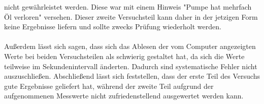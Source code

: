 nicht gewährleistet werden. Diese war mit einem Hinweis "Pumpe hat mehrfach Öl verloren"
versehen. Dieser zweite Versuchsteil kann daher in der jetzigen Form keine Ergebnisse
liefern und sollte zwecks Prüfung wiederholt werden.\\
\\
Außerdem lässt sich sagen, dass sich das Ablesen der vom Computer angezeigten Werte bei beiden Versuchsteilen
als schwierig gestaltet hat, da sich die Werte teilweise im Sekundenintervall änderten.
Dadurch sind systematische Fehler nicht auszuschließen. Abschließend lässt sich feststellen,
dass der erste Teil des Versuchs gute Ergebnisse geliefert hat, während der zweite Teil
aufgrund der aufgenommenen Messwerte nicht zufriedenstellend ausgewertet werden kann.
\newpage
\nocite{*}
\printbibliography
